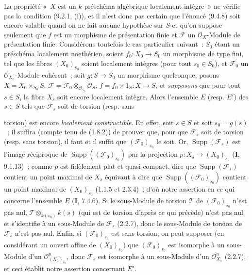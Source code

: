 \begin{remark}[9.4.9]
\label{IV.9.4.9-fr}
La propriété «~$X$ est un $k$-préschéma algébrique localement intègre~» ne
vérifie pas la condition (9.2.1, (i)), et il n'est donc pas certain que
l'énoncé (9.4.8) soit encore valable quand on ne fait aucune hypothèse sur $S$
et qu'on suppose seulement que $f$ est un morphisme de présentation finie et
$\mathcal F$ un $\mathcal O_X$-Module de présentation finie. Considérons
toutefois le cas particulier suivant~: $S_0$ étant un préschéma localement
noethérien, soient $f_0:X_0\to S_0$ un morphisme de type fini, tel que les
fibres $(X_0)_{s_0}$ soient localement intègres (pour tout $s_0\in S_0$), et
$\mathcal F_0$ un $\mathcal O_{X_0}$-Module cohérent~; soit $g:S\to S_0$ un
morphisme quelconque, posons
$X=X_0\times_{S_0}S$, $\mathcal F=\mathcal F_0\otimes_{\mathcal O_{S_0}}
\mathcal O_S$, $f=f_0\times1_S:X\to S$, et \emph{supposons} que pour tout
$s\in S$, la fibre $X_s$ soit encore localement intègre. Alors l'ensemble $E$
(resp. $E'$) des $s\in S$ tels que $\mathcal F_s$ soit de torsion (resp. sans


torsion) est encore \emph{localement constructible}. En effet, soit $s\in S$
et soit $s_0=g(s)$~; il suffira (compte tenu de (1.8.2)) de prouver que, pour
que $\mathcal F_s$ soit de torsion (resp. sans torsion), il faut et il suffit
que $(\mathcal F_0)_{s_0}$ le soit. Or,
$\operatorname{Supp}(\mathcal F_s)$ est l'image réciproque de
$\operatorname{Supp}((\mathcal F_0)_{s_0})$ par la projection
$p:X_s\to(X_0)_{s_0}$ (\textbf{I}, 9.1.13)~; comme $p$ est fidèlement plat et
quasi-compact, dire que $\operatorname{Supp}(\mathcal F_s)$ contient un point
maximal de $X_s$ équivaut à dire que
$\operatorname{Supp}((\mathcal F_0)_{s_0})$ contient un point maximal de
$(X_0)_{s_0}$ (1.1.5 et 2.3.4)~; d'où notre assertion en ce qui concerne
l'ensemble $E$ (\textbf{I}, 7.4.6). Si le sous-Module de torsion $\mathcal T$
de $(\mathcal F_0)_{s_0}$ n'est pas nul,
$\mathcal T\otimes_{k(s_0)}k(s)$ (qui est de torsion d'après ce qui précède)
n'est pas nul et s'identifie à un sous-Module de $\mathcal F_s$ (2.2.7), donc
le sous-Module de torsion de $\mathcal F_s$ n'est pas nul. Enfin, si
$(\mathcal F_0)_{s_0}$ est sans torsion, on peut supposer (en considérant un
ouvert affine de $(X_0)_{s_0}$) que $(\mathcal F_0)_{s_0}$ est isomorphe à un
sous-Module d'un $\mathcal O_{(X_0)_{s_0}}^n$, donc $\mathcal F_s$ est
isomorphe à un sous-Module d'un $\mathcal O_{X_s}^n$ (2.2.7), et ceci établit
notre assertion concernant $E'$.
\end{remark}


